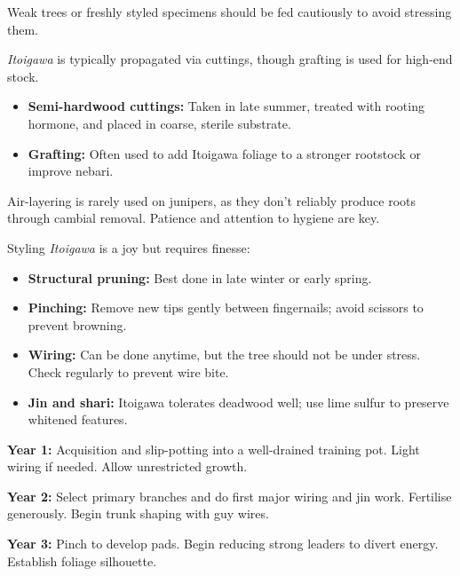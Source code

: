 Weak trees or freshly styled specimens should be fed cautiously to avoid stressing them.

\medskip
{}
\noindent
\textit{Itoigawa} is typically propagated via cuttings, though grafting is used for high\--end stock.

\begin{itemize}
    \item \textbf{Semi\--hardwood cuttings:} Taken in late summer, treated with rooting hormone, and placed in coarse, sterile substrate.

    \item \textbf{Grafting:} Often used to add Itoigawa foliage to a stronger rootstock or improve nebari.
\end{itemize}

Air\--layering is rarely used on junipers, as they don't reliably produce roots through cambial removal.
Patience and attention to hygiene are key.

\medskip
{}
\noindent
Styling \textit{Itoigawa} is a joy but requires finesse:

\begin{itemize}
    \item \textbf{Structural pruning:} Best done in late winter or early spring.

    \item \textbf{Pinching:} Remove new tips gently between fingernails; avoid scissors to prevent browning.

    \item \textbf{Wiring:} Can be done anytime, but the tree should not be under stress.
    Check regularly to prevent wire bite.

    \item \textbf{Jin and shari:} Itoigawa tolerates deadwood well; use lime sulfur to preserve whitened features.
\end{itemize}

\medskip
{}
\noindent
\textbf{Year 1:} Acquisition and slip\--potting into a well\--drained training pot.
Light wiring if needed.
Allow unrestricted growth.

\textbf{Year 2:} Select primary branches and do first major wiring and jin work.
Fertilise generously.
Begin trunk shaping with guy wires.

\textbf{Year 3:} Pinch to develop pads.
Begin reducing strong leaders to divert energy.
Establish foliage silhouette.


